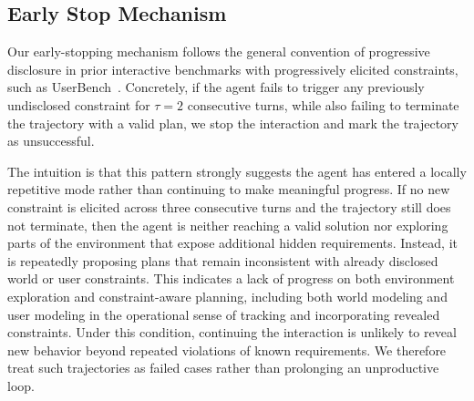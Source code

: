 \subsection{Early Stop Mechanism}
\label{app:early-stop-discussion}

Our early-stopping mechanism follows the general convention of progressive disclosure in prior interactive benchmarks with progressively elicited constraints, such as UserBench~\citep{UserBench}. Concretely, if the agent fails to trigger any previously undisclosed constraint for $\tau=2$ consecutive turns, while also failing to terminate the trajectory with a valid plan, we stop the interaction and mark the trajectory as unsuccessful.

The intuition is that this pattern strongly suggests the agent has entered a locally repetitive mode rather than continuing to make meaningful progress. If no new constraint is elicited across three consecutive turns and the trajectory still does not terminate, then the agent is neither reaching a valid solution nor exploring parts of the environment that expose additional hidden requirements. Instead, it is repeatedly proposing plans that remain inconsistent with already disclosed world or user constraints. This indicates a lack of progress on both environment exploration and constraint-aware planning, including both world modeling and user modeling in the operational sense of tracking and incorporating revealed constraints. Under this condition, continuing the interaction is unlikely to reveal new behavior beyond repeated violations of known requirements. We therefore treat such trajectories as failed cases rather than prolonging an unproductive loop.




